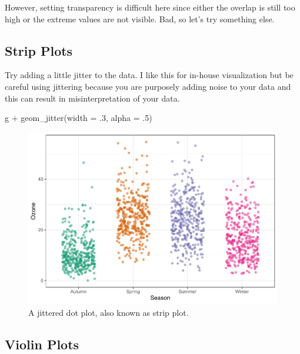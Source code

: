\documentclass[
]{krantz}
\makeatletter
\newenvironment{Shaded}{\begin{snugshade}}{\end{snugshade}}
\newcommand{\AttributeTok}[1]{\textcolor[rgb]{0.61,0.61,0.61}{#1}}
\newcommand{\DecValTok}[1]{\textcolor[rgb]{0.06,0.06,0.06}{#1}}
\newcommand{\FunctionTok}[1]{\textcolor[rgb]{0,0,0}{#1}}
\newcommand{\NormalTok}[1]{#1}
\newcommand{\SpecialCharTok}[1]{\textcolor[rgb]{0,0,0}{#1}}
\newenvironment{kframe}{%
\medskip{}
\setlength{\fboxsep}{.8em}
 \def\at@end@of@kframe{}%
 \ifinner\ifhmode%
  \def\at@end@of@kframe{\end{minipage}}%
  \begin{minipage}{\columnwidth}%
 \fi\fi%
 \def\FrameCommand##1{\hskip\@totalleftmargin \hskip-\fboxsep
 \colorbox{shadecolor}{##1}\hskip-\fboxsep
     \hskip-\linewidth \hskip-\@totalleftmargin \hskip\columnwidth}%
 \MakeFramed {\advance\hsize-\width
   \@totalleftmargin\z@ \linewidth\hsize
   \@setminipage}}%
 {\par\unskip\endMakeFramed%
 \at@end@of@kframe}
\renewenvironment{Shaded}{\begin{kframe}}{\end{kframe}}
\makeatother
\begin{document}
However, setting transparency is difficult here since either the overlap is still too high or the extreme values are not visible. Bad, so let's try something else.

\hypertarget{strip-plots}{%
\subsection{Strip Plots}\label{strip-plots}}

Try adding a little jitter to the data. I like this for in-house visualization but be careful using jittering because you are purposely adding noise to your data and this can result in misinterpretation of your data.

\begin{Shaded}
\begin{Highlighting}[]
\NormalTok{g }\SpecialCharTok{+} \FunctionTok{geom\_jitter}\NormalTok{(}\AttributeTok{width =}\NormalTok{ .}\DecValTok{3}\NormalTok{, }\AttributeTok{alpha =}\NormalTok{ .}\DecValTok{5}\NormalTok{)}
\end{Highlighting}
\end{Shaded}

\begin{figure}
\centering
\includegraphics{bookdown_files/figure-latex/jitter-1.pdf}
\caption{\label{fig:jitter}A jittered dot plot, also known as strip plot.}
\end{figure}

\hypertarget{violin-plots}{%
\subsection{Violin Plots}\label{violin-plots}}
\end{document}
